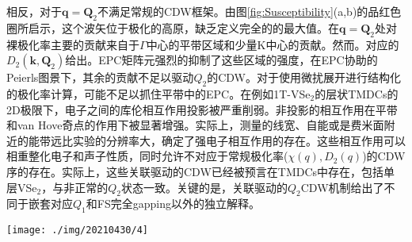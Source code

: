 \documentclass[reprint, aps, prb, showkeys]{revtex4-2}
\begin{document}
相反，对于$\boldsymbol{q} = \boldsymbol{Q}_2$不满足常规的CDW框架。由图\ref{fig:Susceptibility}(a,b)的品红色圈所启示，这个波矢位于极化的高原，缺乏定义完全的的最大值。在$\boldsymbol{q} = \boldsymbol{Q}_2$处对裸极化率主要的贡献来自于$\Gamma$中心的平带区域和少量K中心的贡献。然而。对应的$D_2(\boldsymbol{k},\boldsymbol{Q}_2)$给出。EPC矩阵元强烈的抑制了这些区域的强度，在EPC协助的Peierls图景下，其余的贡献不足以驱动$Q_2$的CDW。对于使用微扰展开进行结构化的极化率计算，可能不足以抓住平带中的EPC。在例如1T-VSe$_2$的层状TMDCs的2D极限下，电子之间的库伦相互作用投影被严重削弱。非投影的相互作用在平带和van Hove奇点的作用下被显著增强。实际上，测量的线宽、自能或是费米面附近的能带远比实验的分辨率大，确定了强电子相互作用的存在。这些相互作用可以相重整化电子和声子性质，同时允许不对应于常规极化率($\chi(q), D_2(q)$)的CDW序的存在。实际上，这些关联驱动的CDW已经被预言在TMDCs中存在，包括单层VSe$_2$，与非正常的$Q_2$状态一致。关键的是，关联驱动的$Q_2$CDW机制给出了不同于嵌套对应$Q_1$和FS完全gapping以外的独立解释。
\begin{figure*}[t]
    \texttt{[image: ./img/20210430/4]}
    \caption{\label{fig:Susceptibility} 
    单层VSe$_2$中CDW的动量空间诊断。
    }
\end{figure*}
\end{document}
